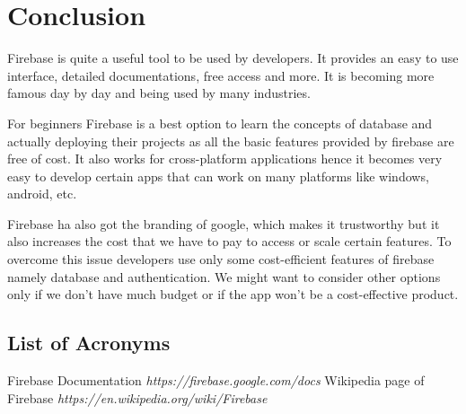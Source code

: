 \documentclass[12pt,a4paper]{report}
\begin{document}
\chapter{\fontsize{18}{0}\selectfont Conclusion }
{\fontsize{14}{0}\selectfont
\noindent
   Firebase is quite a useful tool to be used by developers. It provides an easy to use interface, detailed documentations, free access and more. It is becoming more famous day by day and being used by many industries.
   
   \hspace{1cm}For beginners Firebase is a best option to learn the concepts of database and actually deploying their projects as all the basic features provided by firebase are free of cost. It also works for cross-platform applications hence it becomes very easy to develop certain apps that can work on many platforms like windows, android, etc.

   \hspace{1cm}Firebase ha also got the branding of google, which makes it trustworthy but it also increases the cost that we have to pay to access or scale certain features. To overcome this issue developers use only some cost-efficient features of firebase namely database and authentication. We might want to consider other options only if we don’t have much budget or if the app won’t be a cost-effective product.
}
\newpage


\section*{List of Acronyms}
\begin{acronym}
 
\end{acronym}
\newpage


\begin{thebibliography}{9}
 Firebase Documentation \emph{https://firebase.google.com/docs} %
Wikipedia page of Firebase \emph{https://en.wikipedia.org/wiki/Firebase}
\end{thebibliography}
 
\end{document}

